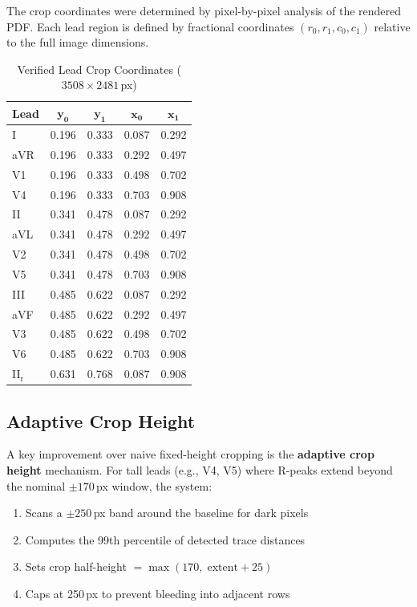 \documentclass[conference]{IEEEtran}
\begin{document}
The crop coordinates were determined by pixel-by-pixel analysis of the
rendered PDF. Each lead region is defined by fractional coordinates
$(r_0, r_1, c_0, c_1)$ relative to the full image dimensions.

\begin{table}[!t]
\centering
\caption{Verified Lead Crop Coordinates ($3508\times2481$\,px)}
\label{tab:crops}
\footnotesize
\begin{tabular}{lcccc}
  \toprule
  \textbf{Lead} & $\mathbf{y_0}$ & $\mathbf{y_1}$ & $\mathbf{x_0}$ & $\mathbf{x_1}$ \\
  \midrule
  I             & 0.196 & 0.333 & 0.087 & 0.292 \\
  aVR           & 0.196 & 0.333 & 0.292 & 0.497 \\
  V1            & 0.196 & 0.333 & 0.498 & 0.702 \\
  V4            & 0.196 & 0.333 & 0.703 & 0.908 \\
  II            & 0.341 & 0.478 & 0.087 & 0.292 \\
  aVL           & 0.341 & 0.478 & 0.292 & 0.497 \\
  V2            & 0.341 & 0.478 & 0.498 & 0.702 \\
  V5            & 0.341 & 0.478 & 0.703 & 0.908 \\
  III           & 0.485 & 0.622 & 0.087 & 0.292 \\
  aVF           & 0.485 & 0.622 & 0.292 & 0.497 \\
  V3            & 0.485 & 0.622 & 0.498 & 0.702 \\
  V6            & 0.485 & 0.622 & 0.703 & 0.908 \\
  II$_\text{r}$ & 0.631 & 0.768 & 0.087 & 0.908 \\
  \bottomrule
\end{tabular}
\end{table}

\subsection{Adaptive Crop Height}

A key improvement over naive fixed-height cropping is the \textbf{adaptive
crop height} mechanism. For tall leads (e.g., V4, V5) where R-peaks extend
beyond the nominal $\pm170$\,px window, the system:

\begin{enumerate}[noitemsep,topsep=2pt]
  \item Scans a $\pm250$\,px band around the baseline for dark pixels
  \item Computes the 99th percentile of detected trace distances
  \item Sets crop half-height $= \max(170,\; \text{extent} + 25)$
  \item Caps at 250\,px to prevent bleeding into adjacent rows
\end{enumerate}
\end{document}
